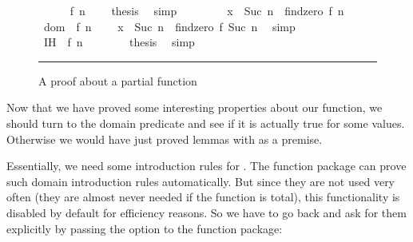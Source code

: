 \begin{isabellebody}
\begin{figure}
\begin{minipage}{0.8\textwidth}
\ \ \ \ \isamarkupfalse%
\ {\isacharbackquoteopen}f\ n\ {\isasymnoteq}\ {}{\isacharbackquoteclose}\ \isamarkupfalse%
\ {\isacharquery}thesis\ \isamarkupfalse%
\ simp\isanewline
\ \ \isamarkupfalse%
\isanewline
\ \ \ \ \isamarkupfalse%
\ {\isachardoublequoteopen}x\ {\isasymin}\ {\isacharbraceleft}Suc\ n\ {\isachardot}{\isachardot}{\isacharless}\ findzero\ f\ n{\isacharbraceright}{\isachardoublequoteclose}\isanewline
\ \ \ \ \isamarkupfalse%
\ dom\ \ {\isacharbackquoteopen}f\ n\ {\isasymnoteq}\ {}{\isacharbackquoteclose}\ \isamarkupfalse%
\ {\isachardoublequoteopen}x\ {\isasymin}\ {\isacharbraceleft}Suc\ n\ {\isachardot}{\isachardot}{\isacharless}\ findzero\ f\ {\isacharparenleft}Suc\ n{\isacharparenright}{\isacharbraceright}{\isachardoublequoteclose}\ \isamarkupfalse%
\ simp\isanewline
\ \ \ \ \isamarkupfalse%
\ IH\ \ {\isacharbackquoteopen}f\ n\ {\isasymnoteq}\ {}{\isacharbackquoteclose}\isanewline
\ \ \ \ \isamarkupfalse%
\ {\isacharquery}thesis\ \isamarkupfalse%
\ simp\isanewline
\ \ \isamarkupfalse%
\isanewline
{}\isamarkupfalse%
%
\endisatagproof
{\isafoldproof}%
%
\isadelimproof
%
\endisadelimproof
%
\isamarkupfalse{}
\end{minipage}\vspace{6pt}\hrule
\caption{A proof about a partial function}\label{findzero_isar}
\end{figure}
%
\isamarkuptrue%
%
\begin{isamarkuptext}%
Now that we have proved some interesting properties about our
  function, we should turn to the domain predicate and see if it is
  actually true for some values. Otherwise we would have just proved
  lemmas with  as a premise.

  Essentially, we need some introduction rules for . The function package can prove such domain
  introduction rules automatically. But since they are not used very
  often (they are almost never needed if the function is total), this
  functionality is disabled by default for efficiency reasons. So we have to go
  back and ask for them explicitly by passing the  option to the function package:


\end{isamarkuptext}
\end{isabellebody}
